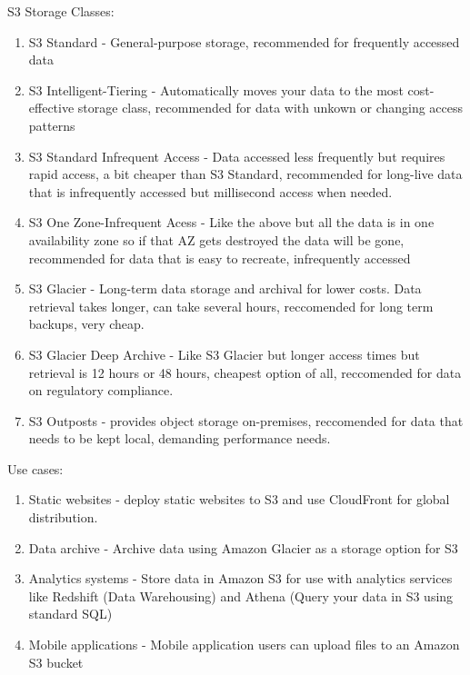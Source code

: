 \documentclass{article}%
\begin{document}
S3 Storage Classes:
\begin{enumerate}
    \item S3 Standard - General-purpose storage, recommended for frequently accessed data
    \item S3 Intelligent-Tiering - Automatically moves your data to the most cost-effective storage class, recommended for data with unkown or changing access patterns
    \item S3 Standard Infrequent Access - Data accessed less frequently but requires rapid access, a bit cheaper than S3 Standard, recommended for long-live data that is infrequently accessed but millisecond access when needed.
    \item S3 One Zone-Infrequent Acess - Like the above but all the data is in one availability zone so if that AZ gets destroyed the data will be gone, recommended for data that is easy to recreate, infrequently accessed
    \item S3 Glacier - Long-term data storage and archival for lower costs. Data retrieval takes longer, can take several hours, reccomended for long term backups, very cheap.
    \item S3 Glacier Deep Archive - Like S3 Glacier but longer access times but retrieval is 12 hours or 48 hours, cheapest option of all, reccomended for data on regulatory compliance.
    \item S3 Outposts - provides object storage on-premises, reccomended for data that needs to be kept local, demanding performance needs.
\end{enumerate}

Use cases:
\begin{enumerate}
    \item Static websites - deploy static websites to S3 and use CloudFront for global distribution.
    \item Data archive - Archive data using Amazon Glacier as a storage option for S3
    \item Analytics systems - Store data in Amazon S3 for use with analytics services like Redshift (Data Warehousing) and Athena (Query your data in S3 using standard SQL)
    \item Mobile applications - Mobile application users can upload files to an Amazon S3 bucket
\end{enumerate}
\end{document}
